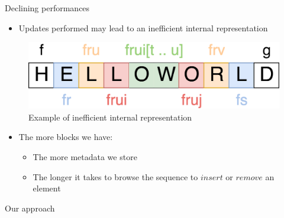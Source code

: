\documentclass[10pt]{beamer}
\begin{document}
\begin{frame}{Declining performances}
  \begin{itemize}
    \item Updates performed may lead to an inefficient internal representation
  \end{itemize}
  \begin{figure}
    \includegraphics[scale=0.15]{img/worst-case.png}
    \caption{Example of inefficient internal representation}
  \end{figure}
  \begin{itemize}
    \item The more blocks we have:
    \begin{itemize}
      \item The more metadata we store
      \item The longer it takes to browse the sequence to $insert$ or $remove$ an element
    \end{itemize}
  \end{itemize}
\end{frame}

\begin{frame}[standout]
  Our approach
\end{frame}
\end{document}
